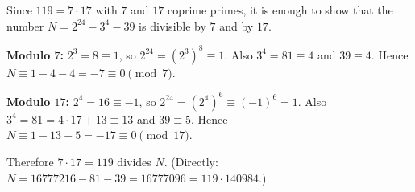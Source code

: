 Since $119=7\cdot17$ with $7$ and $17$ coprime primes, it is enough to show that the number $N=2^{24}-3^4-39$ is divisible by $7$ and by $17$.

\textbf{Modulo $7$:} $2^3=8\equiv1$, so $2^{24}=(2^3)^8\equiv1$. Also $3^4=81\equiv4$ and $39\equiv4$. Hence $N\equiv1-4-4=-7\equiv0\pmod7$.

\textbf{Modulo $17$:} $2^4=16\equiv-1$, so $2^{24}=(2^4)^6\equiv(-1)^6=1$. Also $3^4=81=4\cdot17+13\equiv13$ and $39\equiv5$. Hence $N\equiv1-13-5=-17\equiv0\pmod{17}$.

Therefore $7\cdot17=119$ divides $N$. (Directly: $N=16777216-81-39=16777096=119\cdot140984$.)
